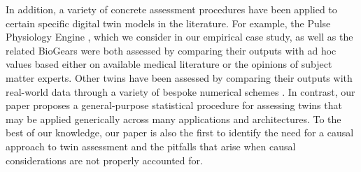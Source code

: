 In addition, a variety of concrete assessment procedures have been applied to certain specific digital twin models in the literature.
For example, the Pulse Physiology Engine \citep{pulse}, which we consider in our empirical case study, as well as the related BioGears \citep{sepsis-modelling,biogears} were both assessed by comparing their outputs with ad hoc values based either on available medical literature or the opinions of subject matter experts.
Other twins have been assessed by comparing their outputs with real-world data through a variety of bespoke numerical schemes \citep{larrabide2012fast,hemmler2019patient,DT-patient,jans2020digital,galappaththige2022credibility}.
In contrast, our paper proposes a general-purpose statistical procedure for assessing twins that may be applied generically across many applications and architectures. %
To the best of our knowledge, our paper is also the first to identify the need for a causal approach to twin assessment and the pitfalls that arise when causal considerations are not properly accounted for.




